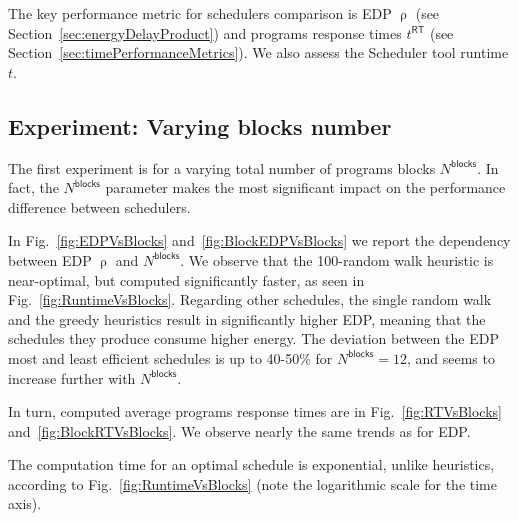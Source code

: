 The key performance metric for schedulers comparison is EDP $\uprho$ (see Section~\ref{sec:energyDelayProduct}) and programs response times $t^\mathsf{RT}$ (see Section~\ref{sec:timePerformanceMetrics}). We also assess the Scheduler tool runtime $t$.



\subsection*{Experiment: Varying blocks number}

The first experiment is for a varying total number of programs blocks $N^\mathsf{blocks}$. In fact, the $N^\mathsf{blocks}$ parameter makes the most significant impact on the performance difference between schedulers.

In Fig.~\ref{fig:EDPVsBlocks} and~\ref{fig:BlockEDPVsBlocks} we report the dependency between EDP $\uprho$ and $N^\mathsf{blocks}$. We observe that the 100-random walk heuristic is near-optimal, but computed significantly faster, as seen in Fig.~\ref{fig:RuntimeVsBlocks}. Regarding other schedules, the single random walk and the greedy heuristics result in significantly higher EDP, meaning that the schedules they produce consume higher energy. The deviation between the EDP most and least efficient schedules is up to 40-50\% for $N^\mathsf{blocks} = 12$, and seems to increase further with $N^\mathsf{blocks}$.

In turn, computed average programs response times are in Fig.~\ref{fig:RTVsBlocks} and~\ref{fig:BlockRTVsBlocks}. We observe nearly the same trends as for EDP.

The computation time for an optimal schedule is exponential, unlike heuristics, according to Fig.~\ref{fig:RuntimeVsBlocks} (note the logarithmic scale for the time axis).

